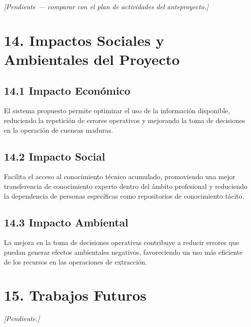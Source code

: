 \documentclass[12pt, a4paper]{report}
\begin{document}
\textit{[Pendiente --- comparar con el plan de actividades del anteproyecto.]}

\chapter*{14. Impactos Sociales y Ambientales del Proyecto}

\section*{14.1 Impacto Económico}

El sistema propuesto permite optimizar el uso de la información disponible, reduciendo la
repetición de errores operativos y mejorando la toma de decisiones en la operación de
cuencas maduras.

\section*{14.2 Impacto Social}

Facilita el acceso al conocimiento técnico acumulado, promoviendo una mejor transferencia
de conocimiento experto dentro del ámbito profesional y reduciendo la dependencia de
personas específicas como repositorios de conocimiento tácito.

\section*{14.3 Impacto Ambiental}

La mejora en la toma de decisiones operativas contribuye a reducir errores que puedan
generar efectos ambientales negativos, favoreciendo un uso más eficiente de los recursos
en las operaciones de extracción.

\chapter*{15. Trabajos Futuros}

\textit{[Pendiente.]}

\end{document}
